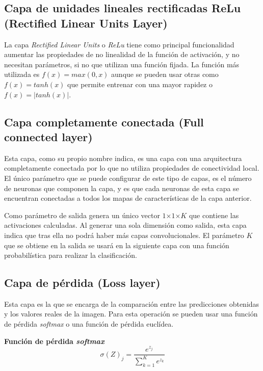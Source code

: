 \subsection{Capa de unidades lineales rectificadas ReLu (Rectified Linear Units Layer)}

La capa \textit{Rectified Linear Units} o \emph{ReLu} tiene como principal funcionalidad aumentar las propiedades de no linealidad de la función de activación, y no necesitan parámetros, si no que utilizan una función fijada. La función más utilizada es $f(x) = max(0,x)$ aunque se pueden usar otras como $f(x) = tanh(x)$ que permite entrenar con una mayor rapidez o $f(x) = |tanh(x)|$.

\subsection{Capa completamente conectada (Full connected layer)}

Esta capa, como su propio nombre indica, es una capa con una arquitectura completamente conectada por lo que no utiliza propiedades de conectividad local. El único parámetro que se puede configurar de este tipo de capas, es el número de neuronas que componen la capa, y es que cada neuronas de esta capa se encuentran conectadas a todos los mapas de características de la capa anterior. 

Como parámetro de salida genera un único vector $1$×$1$×$K$ que contiene las activaciones calculadas. Al generar una sola dimensión como salida, esta capa indica que tras ella no podrá haber más capas convolucionales. El parámetro $K$ que se obtiene en la salida se usará en la siguiente capa con una función probabilística para realizar la clasificación.  

\subsection{Capa de pérdida (Loss layer)}
Esta capa es la que se encarga de la comparación entre las predicciones obtenidas y los valores reales de la imagen. Para esta operación se pueden usar una función de pérdida \textit{softmax} o una función de pérdida euclídea.  

\textbf{Función de pérdida \textit{softmax}}
\begin{equation}
\sigma(Z)_j=\frac{e^{z_j}}{\sum_{k=1}^{K}e^{z_k}}
\end{equation}

